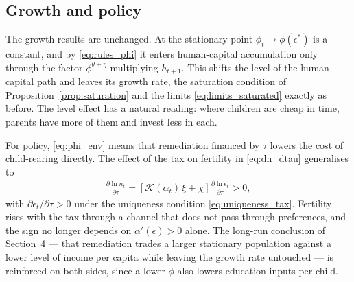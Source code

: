 \documentclass[11pt]{article}
\begin{document}
\subsection{Growth and policy}
The growth results are unchanged. At the stationary point $\phi_t\to\phi(\epsilon^{\ast})$ is a
constant, and by \eqref{eq:rules_phi} it enters human-capital accumulation only through the factor
$\phi^{\theta+\eta}$ multiplying $h_{t+1}$. This shifts the level of the human-capital path and
leaves its growth rate, the saturation condition of Proposition~\ref{prop:saturation} and the
limits \eqref{eq:limits_saturated} exactly as before. The level effect has a natural reading: where
children are cheap in time, parents have more of them and invest less in each.

For policy, \eqref{eq:phi_env} means that remediation financed by $\tau$ lowers the cost of
child-rearing directly. The effect of the tax on fertility in \eqref{eq:dn_dtau} generalises to
\begin{align}
\frac{\partial\ln n_t}{\partial\tau}
=\left[\mathcal{K}(\alpha_t)\,\xi+\chi\right]\frac{\partial\ln\epsilon_t}{\partial\tau}>0,
\label{eq:dn_dtau_two}
\end{align}
with $\partial\epsilon_t/\partial\tau>0$ under the uniqueness condition \eqref{eq:uniqueness_tax}.
Fertility rises with the tax through a channel that does not pass through preferences, and the sign
no longer depends on $\alpha'(\epsilon)>0$ alone. The long-run conclusion of Section~4 --- that
remediation trades a larger stationary population against a lower level of income per capita while
leaving the growth rate untouched --- is reinforced on both sides, since a lower $\phi$ also lowers
education inputs per child.
\end{document}
